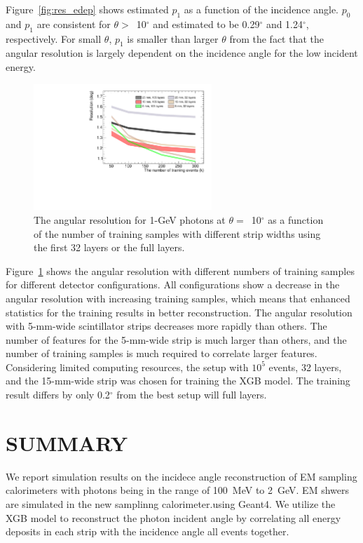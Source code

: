 \documentclass[preprint,12pt,times,a4paper]{elsarticle}
\begin{document}
Figure~\ref{fig:res_edep} shows estimated $p_{1}$ as a function of the incidence angle. $p_{0}$ and $p_{1}$ are consistent for $\theta>$~10$^{\circ}$ and estimated to be 0.29$^{\circ}$ and 1.24$^{\circ}$, respectively. For small $\theta$, $p_{1}$ is smaller than larger $\theta$ from the fact that the angular resolution is largely dependent on the incidence angle for the low incident energy.

\begin{figure}[!hbt]
\centering
\includegraphics[width=0.6\textwidth]{figures/Fig8_nsample.pdf}
\caption{ The angular resolution for 1-GeV photons at $\theta=$~10$^{\circ}$ as a function of the number of training samples with different strip widths using the first 32 layers or the full layers. }
\label{fig:multi-parameter}
\end{figure}

Figure~\ref{fig:multi-parameter} shows the angular resolution with different numbers of training samples for different detector configurations. All configurations show a decrease in the angular resolution with increasing training samples, which means that enhanced statistics for the training results in better reconstruction. The angular resolution with 5-mm-wide scintillator strips decreases more rapidly than others. The number of features for the 5-mm-wide strip is much larger than others, and the number of training samples is much required to correlate larger features. Considering limited computing resources, the setup with $10^{5}$ events, 32 layers, and the 15-mm-wide strip was chosen for training the XGB model. The training result differs by only 0.2$^{\circ}$ from the best setup will full layers.
 
\section{SUMMARY}
\label{sec:sum}

We report simulation results on the incidece angle reconstruction of EM sampling calorimeters with photons being in the range of 100~MeV to 2~GeV. EM shwers are simulated in the new samplinng calorimeter.using Geant4. We utilize the XGB model to reconstruct the photon incident angle by correlating all energy deposits in each strip with the incidence angle all events together.
\end{document}
